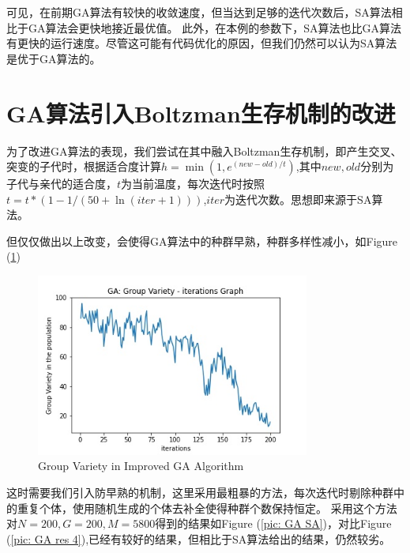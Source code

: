 \documentclass[12pt]{article}
\begin{document}
可见，在前期GA算法有较快的收敛速度，但当达到足够的迭代次数后，SA算法相比于GA算法会更快地接近最优值。
此外，在本例的参数下，SA算法也比GA算法有更快的运行速度。尽管这可能有代码优化的原因，但我们仍然可以认为SA算法是优于GA算法的。


\section{GA算法引入Boltzman生存机制的改进}
\label{sec: SA in GA}

为了改进GA算法的表现，我们尝试在其中融入Boltzman生存机制，即产生交叉、突变的子代时，根据适合度计算$h = \min (1, e^{(new-old)/t})$,其中$new,old$分别为子代与亲代的适合度，$t$为当前温度，每次迭代时按照
$t = t * (1 - 1 / (50 + \ln(iter + 1)))$,$iter$为迭代次数。思想即来源于SA算法。

但仅仅做出以上改变，会使得GA算法中的种群早熟，种群多样性减小，如Figure (\ref{pic: GA SA group variety})
\begin{figure}[H]
  \centering
  \includegraphics[height = 6cm]{../figure/GA_SA_group_variety.jpg}
  \caption{Group Variety in Improved GA Algorithm}
  \label{pic: GA SA group variety}
\end{figure}

这时需要我们引入防早熟的机制，这里采用最粗暴的方法，每次迭代时剔除种群中的重复个体，使用随机生成的个体去补全使得种群个数保持恒定。
采用这个方法对$N=200,G=200,M=5800$得到的结果如Figure (\ref{pic: GA SA})，对比Figure (\ref{pic: GA res 4}),已经有较好的结果，但相比于SA算法给出的结果，仍然较劣。
\end{document}
